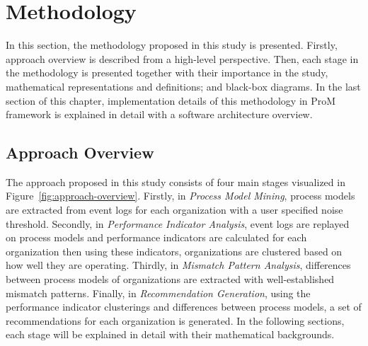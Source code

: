 \section{Methodology}
\label{sec:methodology}
In this section, the methodology proposed in this study is presented. Firstly, approach overview is described from a high-level perspective. Then, each stage in the methodology is presented together with their importance in the study, mathematical representations and definitions; and black-box diagrams. In the last section of this chapter, implementation details of this methodology in ProM framework is explained in detail with a software architecture overview.

\subsection{Approach Overview}
\label{subsec:approach-overview}
The approach proposed in this study consists of four main stages visualized in Figure~\ref{fig:approach-overview}. Firstly, in \textit{Process Model Mining}, process models are extracted from event logs for each organization with a user specified noise threshold. Secondly, in \textit{Performance Indicator Analysis}, event logs are replayed on process models and performance indicators are calculated for each organization then using these indicators, organizations are clustered based on how well they are operating. Thirdly, in \textit{Mismatch Pattern Analysis}, differences between process models of organizations are extracted with well-established mismatch patterns. Finally, in \textit{Recommendation Generation}, using the performance indicator clusterings and differences between process models, a set of recommendations for each organization is generated. In the following sections, each stage will be explained in detail with their mathematical backgrounds.